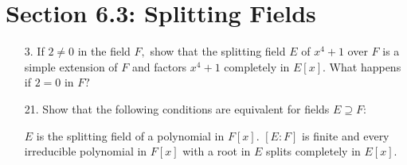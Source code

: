 \documentclass{article}
\begin{document}
\section*{Section 6.3: Splitting Fields}

\begin{itemize}
	\item[3.] If $2\neq 0$ in the field $F,$ show that the splitting field $E$ of $x^4+1$ over $F$ is a simple extension of $F$ and factors $x^4+1$ completely in $E[x].$ What happens if $2=0$ in $F?$

	\item[21.] Show that the following conditions are equivalent for fields $E\supseteq F:$
		\begin{enumerate}[1.]
				\ii $E$ is the splitting field of a polynomial in $F[x].$
				\ii $[E:F]$ is finite and every irreducible polynomial in $F[x]$ with a root in $E$ splits completely in $E[x].$ 
		\end{enumerate}
		
\end{itemize}
\end{document}
